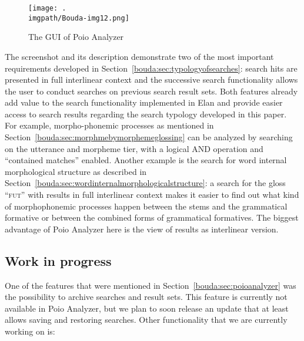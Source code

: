 \begin{figure}
 \texttt{[image: .\\imgpath/Bouda-img12.png]}
\caption{The GUI of Poio Analyzer}
\label{bouda:fig:poioanalyzer}
\end{figure}

The screenshot and its description demonstrate two of the most important requirements developed in Section\ \ref{bouda:sec:typologyofsearches}: search hits are presented in full interlinear context and the successive search functionality allows the user to conduct searches on previous search result sets. Both features already add value to the search functionality implemented in Elan and provide easier access to search results regarding the search typology developed in this paper. For example, morpho-phonemic processes as mentioned in Section\ \ref{bouda:sec:morphmebymorphemeglossing} can be analyzed by searching on the utterance and morpheme tier, with a logical AND operation and ``contained matches'' enabled. Another example is the search for word internal morphological structure as described in Section\ \ref{bouda:sec:wordinternalmorphologicalstructure}:  a search for the gloss ``\textsc{fut}'' with results in full interlinear context makes it easier to find out what kind of morphophonemic processes happen between the stems and the grammatical formative or between the combined forms of grammatical formatives. The biggest advantage of Poio Analyzer here is the view of results as interlinear version.

\subsection{Work in progress}

One of the features that were mentioned in Section\ \ref{bouda:sec:poioanalyzer} was the possibility to archive searches and result sets. This feature is currently not available in Poio Analyzer, but we plan to soon release an update that at least allows saving and restoring searches. Other functionality that we are currently working on is:

